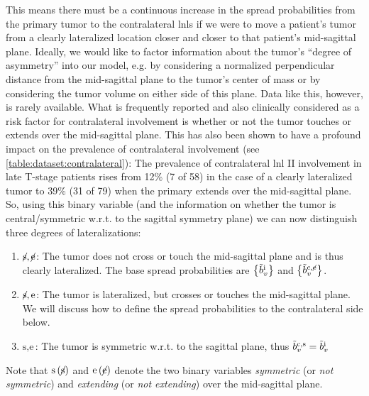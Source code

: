 \documentclass[\relativeRoot/main.tex]{subfiles}
\begin{document}
This means there must be a continuous increase in the spread probabilities from the primary tumor to the contralateral \glspl{lnl} if we were to move a patient's tumor from a clearly lateralized location closer and closer to that patient's mid-sagittal plane. Ideally, we would like to factor information about the tumor's ``degree of asymmetry'' into our model, e.g. by considering a normalized perpendicular distance from the mid-sagittal plane to the tumor's center of mass or by considering the tumor volume on either side of this plane. Data like this, however, is rarely available. What is frequently reported and also clinically considered as a risk factor for contralateral involvement is whether or not the tumor touches or extends over the mid-sagittal plane. This has also been shown to have a profound impact on the prevalence of contralateral involvement (see \cref{table:dataset:contralateral}): The prevalence of contralateral \gls{lnl} II involvement in late T-stage patients rises from 12\% (7 of 58) in the case of a clearly lateralized tumor to 39\% (31 of 79) when the primary extends over the mid-sagittal plane. So, using this binary variable (and the information on whether the tumor is central/symmetric w.r.t. to the sagittal symmetry plane) we can now distinguish three degrees of lateralizations:

\begin{enumerate}
    \item $\centernot{\text{s}} , \centernot{\text{e}}$: The tumor does not cross or touch the mid-sagittal plane and is thus clearly lateralized. The base spread probabilities are $\big\{ \Tilde{b}_v^\text{i} \big\}$ and $\big\{ \Tilde{b}_v^{\text{c},\centernot{\text{e}}} \big\}$.
    \item $\centernot{\text{s}} , \text{e}$: The tumor is lateralized, but crosses or touches the mid-sagittal plane. We will discuss how to define the spread probabilities to the contralateral side below.
    \item $\text{s} , \text{e}$: The tumor is symmetric w.r.t. to the sagittal plane, thus $\Tilde{b}_v^{\text{c},\text{s}} = \Tilde{b}_v^\text{i}$
\end{enumerate}

Note that $\text{s} \, (\centernot{\text{s}})$ and $\text{e} \, (\centernot{\text{e}})$ denote the two binary variables \emph{symmetric} (or \emph{not symmetric}) and \emph{extending} (or \emph{not extending}) over the mid-sagittal plane.
\end{document}
